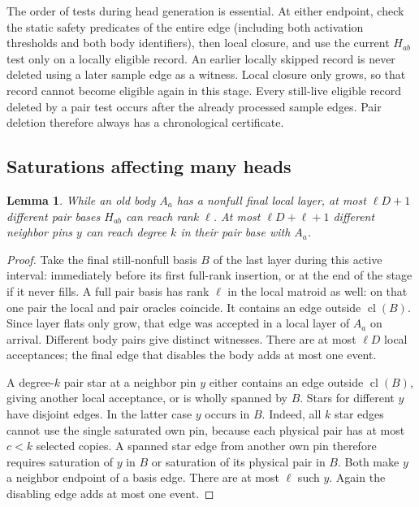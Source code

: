 \documentclass[11pt,a4paper]{article}
\newtheorem{lemma}[theorem]{Lemma}
\theoremstyle{definition}
\theoremstyle{remark}
\begin{document}
The order of tests during head generation is essential.
At either endpoint, check the static safety predicates of
the entire edge (including both activation thresholds and both
body identifiers), then local closure,
and use the current $H_{ab}$ test only on a locally
eligible record. An earlier locally skipped record is
never deleted using a later sample edge as a witness.
Local closure only grows, so that record cannot become
eligible again in this stage. Every still-live eligible
record deleted by a pair test occurs after the already
processed sample edges. Pair deletion therefore always
has a chronological certificate.

\subsection{Saturations affecting many heads}

\begin{lemma}\label{lem:saturation-events}
While an old body $A_a$ has a nonfull final local layer,
at most $\ell D+1$ different pair bases $H_{ab}$ can
reach rank $\ell$. At most $\ell D+\ell+1$ different
neighbor pins $y$ can reach degree $k$ in their pair
base with $A_a$.
\end{lemma}
\begin{proof}
Take the final still-nonfull basis $B$ of the last
layer during this active interval: immediately before its first
full-rank insertion, or at the end of the stage if it never fills.
A full pair basis has rank $\ell$ in the local matroid
as well: on that one pair the local and pair oracles
coincide. It contains an edge outside $\operatorname{cl}(B)$.
Since layer flats only grow, that edge was accepted
in a local layer of $A_a$ on arrival.
Different body pairs give distinct witnesses.
There are at most $\ell D$ local acceptances; the
final edge that disables the body adds at most one event.

A degree-$k$ pair star at a neighbor pin $y$ either
contains an edge outside $\operatorname{cl}(B)$,
giving another local acceptance, or is wholly spanned
by $B$. Stars for different $y$ have disjoint edges.
In the latter case $y$ occurs in $B$.
Indeed, all $k$ star edges cannot use the single
saturated own pin, because each physical pair has
at most $c<k$ selected copies.
A spanned star edge from another own pin therefore
requires saturation of $y$ in $B$ or saturation of
its physical pair in $B$. Both make $y$ a neighbor
endpoint of a basis edge.
There are at most $\ell$ such $y$. Again the disabling
edge adds at most one event.
\end{proof}
\end{document}
